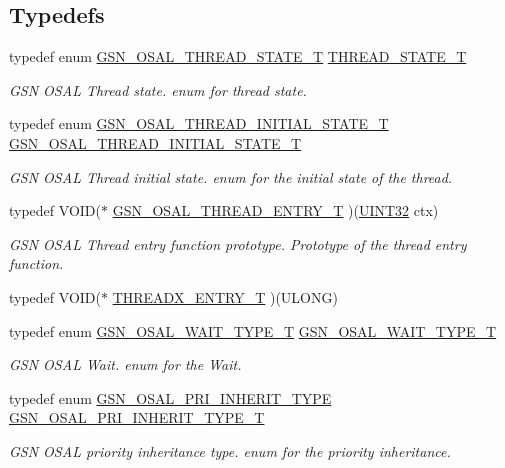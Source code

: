 \subsection*{Typedefs}
\begin{DoxyCompactItemize}
\item 
typedef enum \hyperlink{a00628_gae961839651f7d7d0065cca8c4efb88f6}{GSN\_\-OSAL\_\-THREAD\_\-STATE\_\-T} \hyperlink{a00628_gac436a5e128feda97ba01f557f15bcc57}{THREAD\_\-STATE\_\-T}
\begin{DoxyCompactList}\small\item\em GSN OSAL Thread state. enum for thread state. \end{DoxyCompactList}\item 
typedef enum \hyperlink{a00628_ga0aaa82e357c4ce95100dc1df18ec3363}{GSN\_\-OSAL\_\-THREAD\_\-INITIAL\_\-STATE\_\-T} \hyperlink{a00628_gab9843a3f99a06459775b3380ed83f17d}{GSN\_\-OSAL\_\-THREAD\_\-INITIAL\_\-STATE\_\-T}
\begin{DoxyCompactList}\small\item\em GSN OSAL Thread initial state. enum for the initial state of the thread. \end{DoxyCompactList}\item 
typedef VOID($\ast$ \hyperlink{a00628_ga62a09641cac90719fc0cdb5f204df09b}{GSN\_\-OSAL\_\-THREAD\_\-ENTRY\_\-T} )(\hyperlink{a00660_gae1e6edbbc26d6fbc71a90190d0266018}{UINT32} ctx)
\begin{DoxyCompactList}\small\item\em GSN OSAL Thread entry function prototype. Prototype of the thread entry function. \end{DoxyCompactList}\item 
typedef VOID($\ast$ \hyperlink{a00536_acbde002f87f78d02906adef40c5b6f42}{THREADX\_\-ENTRY\_\-T} )(ULONG)
\item 
typedef enum \hyperlink{a00628_ga5568febc25b2751efc49a3eddcee65f5}{GSN\_\-OSAL\_\-WAIT\_\-TYPE\_\-T} \hyperlink{a00628_gae40be9afbdb44361f83e67879b2ac566}{GSN\_\-OSAL\_\-WAIT\_\-TYPE\_\-T}
\begin{DoxyCompactList}\small\item\em GSN OSAL Wait. enum for the Wait. \end{DoxyCompactList}\item 
typedef enum \hyperlink{a00628_ga4b070e363e5202d1c7e6ffe017b981b9}{GSN\_\-OSAL\_\-PRI\_\-INHERIT\_\-TYPE} \hyperlink{a00628_gafc2ee1bc516d2ae2d9a29757cbe45469}{GSN\_\-OSAL\_\-PRI\_\-INHERIT\_\-TYPE\_\-T}
\begin{DoxyCompactList}\small\item\em GSN OSAL priority inheritance type. enum for the priority inheritance. \end{DoxyCompactList}\item 

\end{DoxyCompactItemize}
